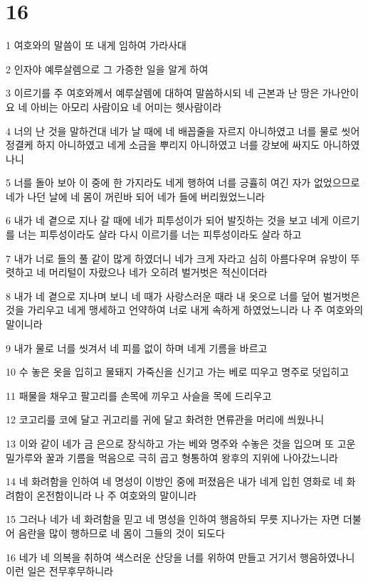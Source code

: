 \chapter{16}

\par 1 여호와의 말씀이 또 내게 임하여 가라사대
\par 2 인자야 예루살렘으로 그 가증한 일을 알게 하여
\par 3 이르기를 주 여호와께서 예루살렘에 대하여 말씀하시되 네 근본과 난 땅은 가나안이요 네 아비는 아모리 사람이요 네 어미는 헷사람이라
\par 4 너의 난 것을 말하건대 네가 날 때에 네 배꼽줄을 자르지 아니하였고 너를 물로 씻어 정결케 하지 아니하였고 네게 소금을 뿌리지 아니하였고 너를 강보에 싸지도 아니하였나니
\par 5 너를 돌아 보아 이 중에 한 가지라도 네게 행하여 너를 긍휼히 여긴 자가 없었으므로 네가 나던 날에 네 몸이 꺼린바 되어 네가 들에 버리웠었느니라
\par 6 내가 네 곁으로 지나 갈 때에 네가 피투성이가 되어 발짓하는 것을 보고 네게 이르기를 너는 피투성이라도 살라 다시 이르기를 너는 피투성이라도 살라 하고
\par 7 내가 너로 들의 풀 같이 많게 하였더니 네가 크게 자라고 심히 아름다우며 유방이 뚜렷하고 네 머리털이 자랐으나 네가 오히려 벌거벗은 적신이더라
\par 8 내가 네 곁으로 지나며 보니 네 때가 사랑스러운 때라 내 옷으로 너를 덮어 벌거벗은 것을 가리우고 네게 맹세하고 언약하여 너로 내게 속하게 하였었느니라 나 주 여호와의 말이니라
\par 9 내가 물로 너를 씻겨서 네 피를 없이 하며 네게 기름을 바르고
\par 10 수 놓은 옷을 입히고 물돼지 가죽신을 신기고 가는 베로 띠우고 명주로 덧입히고
\par 11 패물을 채우고 팔고리를 손목에 끼우고 사슬을 목에 드리우고
\par 12 코고리를 코에 달고 귀고리를 귀에 달고 화려한 면류관을 머리에 씌웠나니
\par 13 이와 같이 네가 금 은으로 장식하고 가는 베와 명주와 수놓은 것을 입으며 또 고운 밀가루와 꿀과 기름을 먹음으로 극히 곱고 형통하여 왕후의 지위에 나아갔느니라
\par 14 네 화려함을 인하여 네 명성이 이방인 중에 퍼졌음은 내가 네게 입힌 영화로 네 화려함이 온전함이니라 나 주 여호와의 말이니라
\par 15 그러나 네가 네 화려함을 믿고 네 명성을 인하여 행음하되 무릇 지나가는 자면 더불어 음란을 많이 행하므로 네 몸이 그들의 것이 되도다
\par 16 네가 네 의복을 취하여 색스러운 산당을 너를 위하여 만들고 거기서 행음하였나니 이런 일은 전무후무하니라
